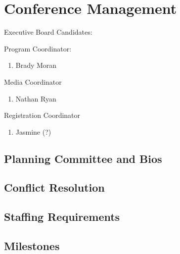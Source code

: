 \section{Conference Management}


Executive Board Candidates:

Program Coordinator:
\begin{enumerate}
\item Brady Moran
\end{enumerate}

Media Coordinator
\begin{enumerate}
\item Nathan Ryan
\end{enumerate}

Registration Coordinator
\begin{enumerate}
\item Jasmine (?)
\end{enumerate}

\subsection{Planning Committee and Bios}
\subsection{Conflict Resolution}
\subsection{Staffing Requirements}
\subsection{Milestones}

